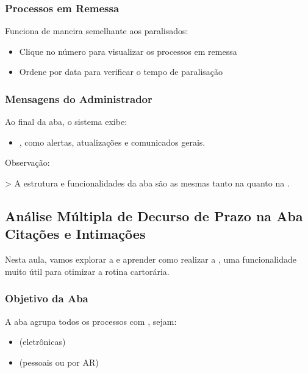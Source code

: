 \documentclass[letterpaper,10pt,brazil]{sphinxmanual}
\begin{document}
\subsubsection{Processos em Remessa}
\label{\detokenize{projud_03_abainicio:processos-em-remessa}}
\sphinxAtStartPar
Funciona de maneira semelhante aos paralisados:
\begin{itemize}
\item {} 
\sphinxAtStartPar
Clique no número para visualizar os processos em remessa

\item {} 
\sphinxAtStartPar
Ordene por data para verificar o tempo de paralisação

\end{itemize}


\subsubsection{Mensagens do Administrador}
\label{\detokenize{projud_03_abainicio:mensagens-do-administrador}}
\sphinxAtStartPar
Ao final da aba, o sistema exibe:
\begin{itemize}
\item {} 
\sphinxAtStartPar
{}, como alertas, atualizações e comunicados gerais.

\end{itemize}

\sphinxAtStartPar
Observação:

\sphinxAtStartPar
\textgreater{} A estrutura e funcionalidades da aba  são as mesmas tanto na  quanto na .

\sphinxstepscope


\subsection{Análise Múltipla de Decurso de Prazo na Aba Citações e Intimações}
\label{\detokenize{projud_04_analisemultipla:analise-multipla-de-decurso-de-prazo-na-aba-citacoes-e-intimacoes}}\label{\detokenize{projud_04_analisemultipla::doc}}
\sphinxAtStartPar
Nesta aula, vamos explorar a  e aprender como realizar a , uma funcionalidade muito útil para otimizar a rotina cartorária.


\subsubsection{Objetivo da Aba}
\label{\detokenize{projud_04_analisemultipla:objetivo-da-aba}}
\sphinxAtStartPar
A aba agrupa todos os processos com , sejam:
\begin{itemize}
\item {} 
\sphinxAtStartPar
{} (eletrônicas)

\item {} 
\sphinxAtStartPar
{} (pessoais ou por AR)

\end{itemize}
\end{document}
